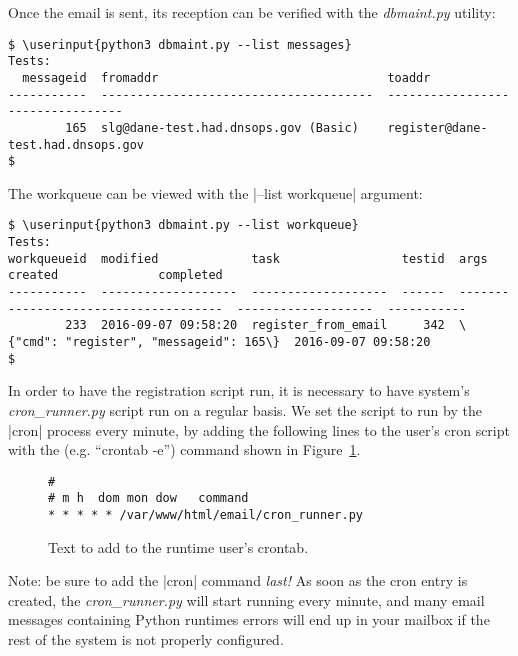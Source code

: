 \documentclass[preprint,3p,11pt]{elsarticle}
\newcommand\userinput[1]{\textbf{#1}}
\begin{document}
Once the email is sent, its reception can be verified with the
\emph{dbmaint.py} utility:

\begin{Verbatim}[commandchars=\\\{\},fontsize=\tiny]
$ \userinput{python3 dbmaint.py --list messages}
Tests:
  messageid  fromaddr                                toaddr                                    
-----------  --------------------------------------  ---------------------------------
        165  slg@dane-test.had.dnsops.gov (Basic)    register@dane-test.had.dnsops.gov         
$
\end{Verbatim}

The workqueue can be viewed with the |--list workqueue| argument:

\begin{Verbatim}[commandchars=\\\{\},fontsize=\tiny]
$ \userinput{python3 dbmaint.py --list workqueue}
Tests:
workqueueid  modified             task                 testid  args                                   created              completed
-----------  -------------------  -------------------  ------  -------------------------------------  -------------------  -----------
        233  2016-09-07 09:58:20  register_from_email     342  \{"cmd": "register", "messageid": 165\}  2016-09-07 09:58:20
$
\end{Verbatim}


In order to have the registration script run, it is necessary to have
system's \emph{cron\_runner.py} script run on a regular basis. We set the
script to run by the |cron| process every minute, by adding the
following lines to the user's cron script with the (e.g. ``crontab
-e'') command shown in Figure~\ref{cron}.

\begin{figure}
\begin{Verbatim}[commandchars=\\\{\},fontsize=\small,frame=single]
#
# m h  dom mon dow   command
* * * * * /var/www/html/email/cron_runner.py
\end{Verbatim}
\caption{Text to add to the runtime user's crontab.}\label{cron}
\end{figure}

Note: be sure to add the |cron| command \emph{last!} As soon as the cron entry is created, the \emph{cron\_runner.py} will start running every minute, and many email messages containing Python runtimes errors will end up in your mailbox if the rest of the system is not properly configured.
\end{document}
